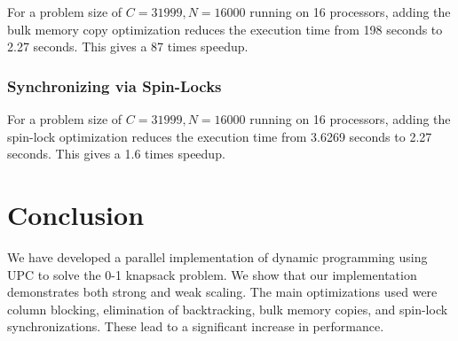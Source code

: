 \documentclass[11pt]{article} %
\begin{document}
For a problem size of $C = 31999, N = 16000$ running on 16 processors, adding the bulk memory copy optimization reduces the execution time from 198 seconds to 2.27 seconds. This gives a 87 times speedup.

\subsubsection{Synchronizing via Spin-Locks}

For a problem size of $C = 31999, N = 16000$ running on 16 processors, adding the spin-lock optimization reduces the execution time from 3.6269 seconds to 2.27 seconds. This gives a 1.6 times speedup.

\section{Conclusion}

We have developed a parallel implementation of dynamic programming using UPC to solve the 0-1 knapsack problem. We show that our implementation demonstrates both strong and weak scaling. The main optimizations used were column blocking, elimination of backtracking, bulk memory copies, and spin-lock synchronizations. These lead to a significant increase in performance.
\end{document}
